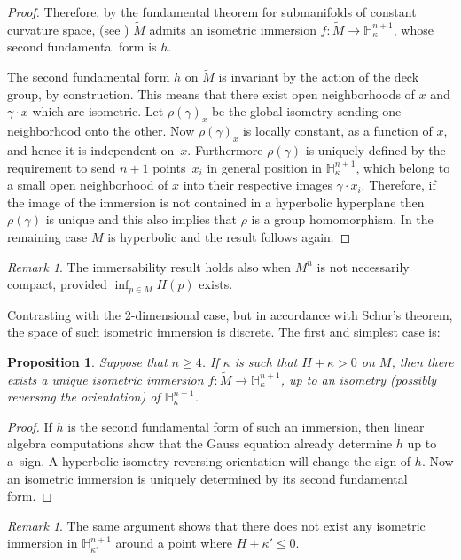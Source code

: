 \documentclass[JEP,XML,SOM,Unicode]{cedram}
\newtheorem{proposition}[theorem]{Proposition}
\theoremstyle{definition}
\theoremstyle{remark}
\newtheorem{remark}[theorem]{Remark}
\numberwithin{equation}{section}
\begin{document}
\begin{proof}
Therefore, by the fundamental theorem for submanifolds of constant curvature
space, (see \cite[Chap.\,7, \S C, Th.\,21]{S}) $\widetilde{M}$
admits an isometric immersion $f:\widetilde{M}\to \mathbb H_{\kappa}^{n+1}$, whose
second fundamental form is $h$.

The second fundamental form $h$ on $\widetilde{M}$ is invariant
by the action of the deck group, by construction. This means that there exist
open neighborhoods of $x$ and $\gamma\cdot x$ which are isometric.
Let $\rho(\gamma)_x$ be the global isometry sending one neighborhood onto the
other. Now $\rho(\gamma)_x$ is locally constant, as a function of $x$,
and hence it is independent on~$x$. Furthermore $\rho(\gamma)$ is
uniquely defined by the requirement to send $n+1$ points~$x_i$
in general position in $\mathbb H_{\kappa}^{n+1}$, which belong to
a small open neighborhood of $x$ into their respective
images $\gamma\cdot x_i$. Therefore, if the image of the immersion is
not contained in a hyperbolic hyperplane then $\rho(\gamma)$ is unique
and this also implies that $\rho$ is a group homomorphism.
In the remaining case $M$ is hyperbolic and the result follows again.
\end{proof}

\begin{remark}
The immersability result holds also when $M^n$ is not
necessarily compact, provided $\inf_{p\in M} H(p)$ exists.
\end{remark}

Contrasting with the 2-dimensional case, but in accordance with Schur's
theorem, the space of such isometric immersion is discrete. The first
and simplest case is:
\begin{proposition}\label{unique-immerse}
Suppose that $n\geq4$. If $\kappa$ is such that $H+\kappa >0$ on $M$, then
there exists a unique isometric immersion
$f:\widetilde{M}\to \mathbb H_{\kappa}^{n+1}$, up
to an isometry (possibly reversing the orientation) of $\mathbb H_{\kappa}^{n+1}$.
\end{proposition}
\begin{proof}
If $h$ is the second fundamental form of such an immersion, then
linear algebra computations show that the Gauss equation already
determine $h$ up to a~sign. A hyperbolic isometry reversing orientation will
change the sign of $h$. Now an isometric
immersion is uniquely determined by its second fundamental form.
\end{proof}
\begin{remark}
The same argument shows that there does not exist any isometric immersion in
$\mathbb H_{\kappa'}^{n+1}$ around a point where $H+\kappa' \leq 0$.
\end{remark}
\end{document}
